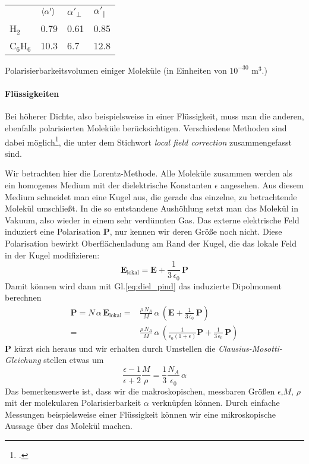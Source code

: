 \begin{marginfigure}
\begin{tabular}{llll}
 & $\braket{\alpha'} $ & $\alpha'_\perp$ & $\alpha'_\parallel$ \\
H$_2$ & 0.79 & 0.61 & 0.85 \\
C$_6$H$_6$ & 10.3 & 6.7 & 12.8 
\end{tabular}
\caption{Polarisierbarkeitsvolumen einiger Moleküle (in Einheiten von $10^{-30}$ m$^3$.)}
\end{marginfigure}

\paragraph{Flüssigkeiten} Bei höherer Dichte, also beispielsweise in einer Flüssigkeit, muss man die anderen, ebenfalls polarisierten Moleküle berücksichtigen. Verschiedene Methoden sind dabei möglich\footcite{Parson}, die unter dem Stichwort \emph{local field correction} zusammengefasst sind.

Wir betrachten hier die Lorentz-Methode. Alle Moleküle zusammen werden als  ein homogenes Medium mit der  dielektrische Konstanten $\epsilon$  angesehen. Aus diesem Medium schneidet man eine Kugel aus, die gerade das einzelne, zu betrachtende Molekül umschließt. In die so entstandene Aushöhlung setzt man das Molekül in Vakuum, also wieder in einem sehr verdünnten Gas. Das externe elektrische Feld induziert eine Polarisation  $\mathbf{P}$, nur kennen wir deren Größe noch nicht. Diese Polarisation bewirkt  Oberflächenladung am Rand der Kugel, die das lokale Feld in der Kugel modifizieren:
\begin{equation}
\mathbf{E}_\text{lokal} = \mathbf{E} + \frac{1}{3 \, \epsilon_0} \, \mathbf{P}
\end{equation}
Damit können wird dann mit Gl.\ref{eq:diel_pind} das induzierte Dipolmoment berechnen
\begin{align}
 \mathbf{P} = N \, \alpha \, \mathbf{E}_\text{lokal} =&
   \frac{\rho \, N_A }{M} \, \alpha \, \left( \mathbf{E} + \frac{1}{3 \, \epsilon_0} \, \mathbf{P} \right)   \\
   =&
     \frac{\rho \, N_A }{M} \, \alpha \, \left( \frac{1}{\epsilon_0 (1 + \epsilon)}\mathbf{P} + \frac{1}{3 \, \epsilon_0} \, \mathbf{P} \right) 
\end{align}
 $\mathbf{P}$ kürzt sich heraus und wir erhalten durch Umstellen die 
\emph{Clausius-Mosotti-Gleichung}
 stellen etwas um
 \begin{equation}
 \frac{\epsilon - 1}{\epsilon + 2} \frac{M}{\rho} = \frac{1}{3} \frac{N_A}{\epsilon
_0} \, \alpha \label{eq:diel_Clausius-Mosotti}
 \end{equation}
 Das bemerkenswerte ist, dass wir die makroskopischen, messbaren Größen $\epsilon$,$M$, $\rho$ mit der molekularen Polarisierbarkeit $\alpha$ verknüpfen können. Durch einfache Messungen beispielsweise einer Flüssigkeit können wir eine mikroskopische Aussage über das Molekül machen.
 
